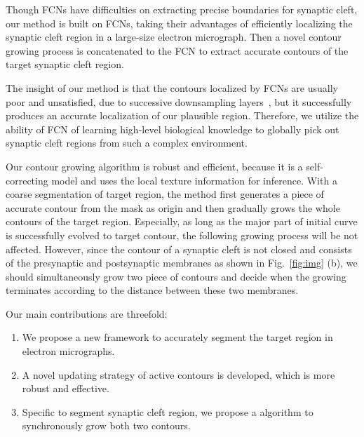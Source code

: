 Though FCNs have difficulties on extracting precise boundaries for synaptic cleft, our method is built on FCNs, taking their advantages of efficiently localizing the synaptic cleft region in a large-size electron micrograph.
%
Then a novel contour growing process is concatenated to the FCN to extract accurate contours of the target synaptic cleft region.
%

The insight of our method is that the contours localized by FCNs are usually poor and unsatisfied, due to successive downsampling layers~\cite{Chen2017}, but it successfully produces an accurate localization of our plausible region.
%
Therefore, we utilize the ability of FCN of learning high-level biological knowledge to globally pick out synaptic cleft regions from such a complex environment.
%

Our contour growing algorithm is robust and efficient, because it is a self-correcting model and uses the local texture information for inference.
With a coarse segmentation of target region, the method first generates a piece of accurate contour from the mask as origin and then gradually grows the whole contours of the target region.
Especially, as long as the major part of initial curve is successfully evolved to target contour, the following growing process will be not affected.
%
However, since the contour of a synaptic cleft is not closed and consists of the presynaptic and postsynaptic membranes as shown in Fig.~\ref{fig:img} (b), we should simultaneously grow two piece of contours and decide when the growing terminates according to the distance between these two membranes.


Our main contributions are threefold:
\begin{enumerate}
	\item We propose a new framework to accurately segment the target region in electron micrographs.
	\item A novel updating strategy of active contours is developed, which is more robust and effective.
	\item Specific to segment synaptic cleft region, we propose a algorithm to synchronously grow both two contours.
\end{enumerate}
